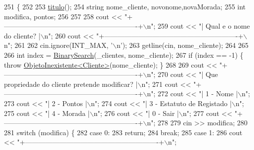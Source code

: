 \begin{DoxyCode}
251                               \{
252 
253     \hyperlink{classEmpresa_ad79f7196a8ce7256771cbd7b9542155c}{titulo}();
254     \textcolor{keywordtype}{string} nome\_cliente, novonome,novaMorada;
255     \textcolor{keywordtype}{int} modifica, pontos;
256 
257 
258     cout << \textcolor{stringliteral}{"+----------------------------------------------------------+\(\backslash\)n"};
259     cout << \textcolor{stringliteral}{"| Qual e o nome do cliente?                                |\(\backslash\)n"};
260     cout << \textcolor{stringliteral}{"+----------------------------------------------------------+\(\backslash\)n"};
261 
262     cin.ignore(INT\_MAX, \textcolor{charliteral}{'\(\backslash\)n'});
263     getline(cin, nome\_cliente);
264 
265 
266     \textcolor{keywordtype}{int} index = \hyperlink{extras_8h_abc85c93edf561168b5bbee8054caa388}{BinarySearch}(\_clientes, nome\_cliente);
267     \textcolor{keywordflow}{if} (index == -1) \{ \textcolor{keywordflow}{throw} \hyperlink{classObjetoInexistente}{ObjetoInexistente<Cliente>}(nome\_cliente); \}
268 
269     cout << \textcolor{stringliteral}{"+----------------------------------------------------------+\(\backslash\)n"};
270     cout << \textcolor{stringliteral}{"| Que propriedade do cliente pretende modificar?           |\(\backslash\)n"};
271     cout << \textcolor{stringliteral}{"+----------------------------------------------------------+\(\backslash\)n"};
272     cout << \textcolor{stringliteral}{"| 1 - Nome                                                 |\(\backslash\)n"};
273     cout << \textcolor{stringliteral}{"| 2 - Pontos                                               |\(\backslash\)n"};
274     cout << \textcolor{stringliteral}{"| 3 - Estatuto de Registado                                |\(\backslash\)n"};
275     cout << \textcolor{stringliteral}{"| 4 - Morada                                               |\(\backslash\)n"};
276     cout << \textcolor{stringliteral}{"| 0 - Sair                                                 |\(\backslash\)n"};
277     cout << \textcolor{stringliteral}{"+----------------------------------------------------------+\(\backslash\)n"};
278 
279     cin >> modifica;
280 
281     \textcolor{keywordflow}{switch} (modifica) \{
282     \textcolor{keywordflow}{case} 0:
283         \textcolor{keywordflow}{return};
284         \textcolor{keywordflow}{break};
285     \textcolor{keywordflow}{case} 1:
286         cout << \textcolor{stringliteral}{"+----------------------------------------------------------+\(\backslash\)n"};

\end{DoxyCode}
